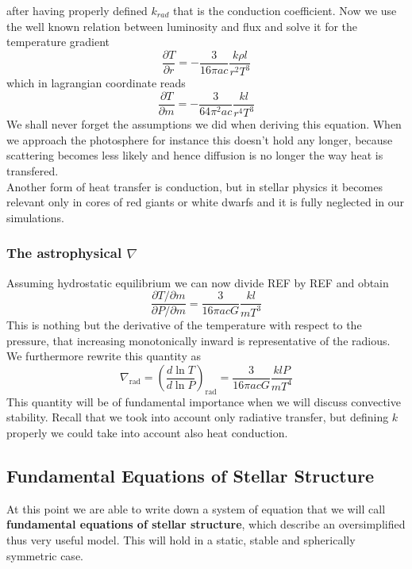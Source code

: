 \documentclass[11pt]{article}
\numberwithin{equation}{section}
\begin{document}
after having properly defined $k_{rad}$ that is the conduction coefficient. Now we use the well known relation between luminosity and flux and solve it for the temperature gradient
\begin{equation}
	\frac{\partial T}{\partial r}= - \frac{3}{16 \pi a c}\frac{k \rho l}{r^2 T^3}
\end{equation}
which in lagrangian coordinate reads
\begin{equation}\label{partialTpartialm}
	\frac{\partial T}{\partial m}= - \frac{3}{64 \pi^2 a c}\frac{k l}{r^4 T^3}
\end{equation}
We shall never forget the assumptions we did when deriving this equation. When we approach the photosphere for instance this doesn't hold any longer, because scattering becomes less likely and hence diffusion is no longer the way heat is transfered. \\
Another form of heat transfer is conduction, but in stellar physics it becomes relevant only in cores of red giants or white dwarfs and it is fully neglected in our simulations.
\subsubsection{The astrophysical $\nabla$}
Assuming hydrostatic equilibrium we can now divide REF by REF and obtain
\begin{equation}
	\frac{\partial T/\partial m}{\partial P / \partial m} = \frac{3}{16 \pi a c G} \frac{k l}{m T^3}
\end{equation}
This is nothing but the derivative of the temperature with respect to the pressure, that increasing monotonically inward is representative of the radious. We furthermore rewrite this quantity as
\begin{equation}\label{nablarad}
	\nabla_{\mathrm{rad}} = \left( \frac{d \ln T}{d \ln P}  \right)_{\mathrm{rad}}= \frac{3}{16 \pi a c G} \frac{k l P}{m T^4}
\end{equation}
This quantity will be of fundamental importance when we will discuss convective stability. Recall that we took into account only radiative transfer, but defining $k$ properly we could take into account also heat conduction.
\subsection{Fundamental Equations of Stellar Structure}
At this point we are able to write down a system of equation that we will call \textbf{fundamental equations of stellar structure}, which describe an oversimplified thus very useful model. This will hold in a static, stable and spherically symmetric case.\\
\end{document}
